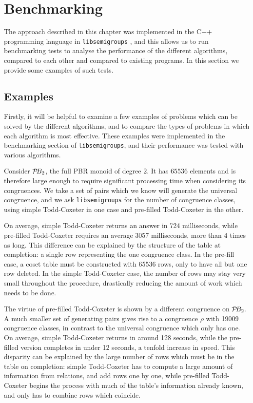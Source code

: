 \section{Benchmarking}
\label{sec:benchmarking}

The approach described in this chapter was implemented in the C++ programming
language in \texttt{libsemigroups} \cite{libsemigroups}, and this allows us to
run benchmarking tests to analyse the performance of the different algorithms,
compared to each other and compared to existing programs.  In this section we
provide some examples of such tests.

\subsection{Examples}
Firstly, it will be helpful to examine a few examples of problems which can be
solved by the different algorithms, and to compare the types of problems in
which each algorithm is most effective.  These examples were implemented in the
benchmarking section of \texttt{libsemigroups}, and their performance was tested
with various algorithms.

\begin{example}
  \label{ex:good-tc}
  Consider $\mathcal{P}\!B_2$, the full PBR monoid of degree $2$.  It has $65536$ elements
  and is therefore large enough to require significant processing time when
  considering its congruences.   We take a set of pairs which we know will
  generate the universal congruence, and we ask \texttt{libsemigroups} for the
  number of congruence classes, using simple Todd-Coxeter in one case and
  pre-filled Todd-Coxeter in the other.

  On average, simple Todd-Coxeter returns an answer in 724 milliseconds, while
  pre-filled Todd-Coxeter requires an average 3057 milliseconds, more than 4
  times as long.  This difference can be explained by the structure
  of the table at completion: a single row representing the one congruence
  class.  In the pre-fill case, a coset table must be constructed with 65536
  rows, only to have all but one row deleted.  In the simple Todd-Coxeter case,
  the number of rows may stay very small throughout the procedure, drastically
  reducing the amount of work which needs to be done.
\end{example}

\begin{example}
  \label{ex:good-tc-prefill}
  The virtue of pre-filled Todd-Coxeter is shown by a different congruence on
  $\mathcal{P}\!B_2$.  A much smaller set of generating pairs gives rise to a congruence
  $\rho$ with 19009 congruence classes, in contrast to the universal congruence
  which only has one.  On average, simple Todd-Coxeter returns in around 128
  seconds, while the pre-filled version completes in under 12 seconds, a tenfold
  increase in speed.  This disparity can be explained by the large number of
  rows which must be in the table on completion: simple Todd-Coxeter has to
  compute a large amount of information from relations, and add rows one by one,
  while pre-filled Todd-Coxeter begins the process with much of the table's
  information already known, and only has to combine rows which coincide.
\end{example}

